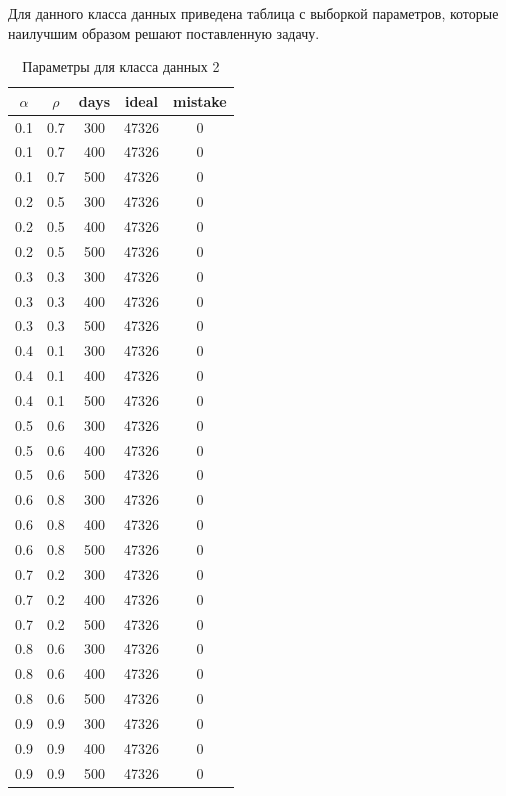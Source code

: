 Для данного класса данных приведена таблица с выборкой параметров, которые наилучшим образом решают поставленную задачу.

\begin{center}
    \captionsetup{justification=raggedright,singlelinecheck=off}
    \begin{longtable}[c]{|c|c|c|c|c|}
    \caption{Параметры для класса данных 2\label{tbl:table_kd2}}\\ \hline
        $\alpha$ & $\rho$ & days & ideal & mistake \\ \hline
 0.1 &  0.7 &  300 & 47326 &     0 \\
 0.1 &  0.7 &  400 & 47326 &     0 \\
 0.1 &  0.7 &  500 & 47326 &     0 \\
 \hline
 0.2 &  0.5 &  300 & 47326 &     0 \\
 0.2 &  0.5 &  400 & 47326 &     0 \\
 0.2 &  0.5 &  500 & 47326 &     0 \\
 \hline
 0.3 &  0.3 &  300 & 47326 &     0 \\
 0.3 &  0.3 &  400 & 47326 &     0 \\
 0.3 &  0.3 &  500 & 47326 &     0 \\
\hline
 0.4 &  0.1 &  300 & 47326 &     0 \\
 0.4 &  0.1 &  400 & 47326 &     0 \\
 0.4 &  0.1 &  500 & 47326 &     0 \\
\hline
 0.5 &  0.6 &  300 & 47326 &     0 \\
 0.5 &  0.6 &  400 & 47326 &     0 \\
 0.5 &  0.6 &  500 & 47326 &     0 \\
 \hline
 0.6 &  0.8 &  300 & 47326 &     0 \\
 0.6 &  0.8 &  400 & 47326 &     0 \\
 0.6 &  0.8 &  500 & 47326 &     0 \\
\hline
 0.7 &  0.2 &  300 & 47326 &     0 \\
 0.7 &  0.2 &  400 & 47326 &     0 \\
 0.7 &  0.2 &  500 & 47326 &     0 \\
\hline
 0.8 &  0.6 &  300 & 47326 &     0 \\
 0.8 &  0.6 &  400 & 47326 &     0 \\
 0.8 &  0.6 &  500 & 47326 &     0 \\
\hline
 0.9 &  0.9 &  300 & 47326 &     0 \\
 0.9 &  0.9 &  400 & 47326 &     0 \\
 0.9 &  0.9 &  500 & 47326 &     0 \\
\hline
\end{longtable}
\end{center}

